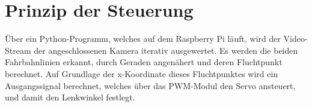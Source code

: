 \section{Prinzip der Steuerung} 	
  Über ein Python-Programm, welches auf dem Raspberry Pi läuft, wird der Video-Stream der angeschlossenen Kamera iterativ ausgewertet. Es werden die beiden Fahrbahnlinien erkannt, durch Geraden angenähert und deren Fluchtpunkt berechnet. Auf Grundlage der x-Koordinate dieses Fluchtpunktes wird ein Ausgangssignal berechnet, welches über das PWM-Modul den Servo ansteuert, und damit den Lenkwinkel festlegt.  
